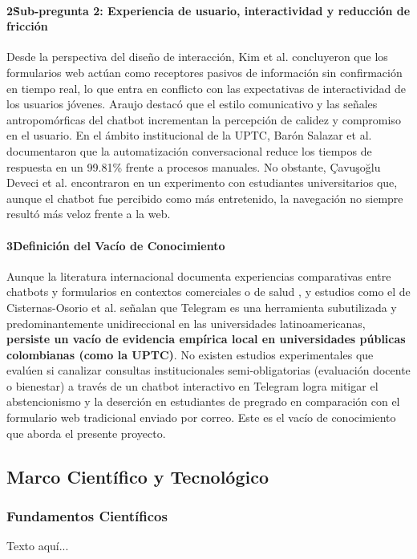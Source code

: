 \documentclass[12pt,letterpaper]{article}
\begin{document}
\paragraph{2\. Sub-pregunta 2: Experiencia de usuario, interactividad y reducción de fricción}
Desde la perspectiva del diseño de interacción, Kim et al. \cite{kim2019} concluyeron que los formularios web actúan como receptores pasivos de información sin confirmación en tiempo real, lo que entra en conflicto con las expectativas de interactividad de los usuarios jóvenes. Araujo \cite{araujo2018} destacó que el estilo comunicativo y las señales antropomórficas del chatbot incrementan la percepción de calidez y compromiso en el usuario. En el ámbito institucional de la UPTC, Barón Salazar et al. \cite{baronsalazar2026} documentaron que la automatización conversacional reduce los tiempos de respuesta en un 99.81\% frente a procesos manuales. No obstante, Çavuşoğlu Deveci et al. \cite{cavusoglu2026} encontraron en un experimento con estudiantes universitarios que, aunque el chatbot fue percibido como más entretenido, la navegación no siempre resultó más veloz frente a la web.
 
\paragraph{3\. Definición del Vacío de Conocimiento}
Aunque la literatura internacional documenta experiencias comparativas entre chatbots y formularios en contextos comerciales o de salud \cite{tepas2020}, y estudios como el de Cisternas-Osorio et al. \cite{cisternas2022} señalan que Telegram es una herramienta subutilizada y predominantemente unidireccional en las universidades latinoamericanas, \textbf{persiste un vacío de evidencia empírica local en universidades públicas colombianas (como la UPTC)}. No existen estudios experimentales que evalúen si canalizar consultas institucionales semi-obligatorias (evaluación docente o bienestar) a través de un chatbot interactivo en Telegram logra mitigar el abstencionismo y la deserción en estudiantes de pregrado en comparación con el formulario web tradicional enviado por correo. Este es el vacío de conocimiento que aborda el presente proyecto.
 

\subsection{Marco Científico y Tecnológico}

\subsubsection{Fundamentos Científicos}
Texto aquí...
\end{document}

